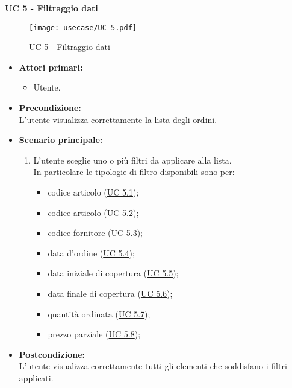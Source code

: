 \noindent \textbf{\large UC 5 - Filtraggio dati}
\label{uc:filtraggio-dati}
\begin{figure}[!h] 
    \centering 
    \texttt{[image: usecase/UC 5.pdf]} 
    \caption{UC 5 - Filtraggio dati}
\end{figure}
\begin{itemize}

	\item \textbf{Attori primari: }
		\begin{itemize}
			\item Utente.
		\end{itemize}

	\item \textbf{Precondizione: }\\[0.3cm]
		L'utente visualizza correttamente la lista degli ordini.

	\item \textbf{Scenario principale: }
		\begin{enumerate}
			\item L'utente sceglie uno o più filtri da applicare alla lista.\\
			In particolare le tipologie di filtro disponibili sono per:
			\begin{itemize}
				\item codice articolo (\hyperref[uc:filtraggio-codice-articolo]{UC 5.1});
				\item codice articolo (\hyperref[uc:filtraggio-codice-articolo]{UC 5.2});
				\item codice fornitore (\hyperref[uc:filtraggio-codice-fornitore]{UC 5.3});
				\item data d'ordine (\hyperref[uc:filtraggio-data-ordine]{UC 5.4});
				\item data iniziale di copertura (\hyperref[uc:filtraggio-data-iniziale-copertura]{UC 5.5});
				\item data finale di copertura (\hyperref[uc:filtraggio-data-finale-copertura]{UC 5.6});
				\item quantità ordinata (\hyperref[uc:filtraggio-quantita-ordinata]{UC 5.7});
				\item prezzo parziale (\hyperref[uc:filtraggio-prezzo-parziale-ord]{UC 5.8});
			\end{itemize}
		\end{enumerate}
		

	\item \textbf{Postcondizione: }\\[0.3cm]
		L'utente visualizza correttamente tutti gli elementi che soddisfano i filtri applicati.

\end{itemize}

